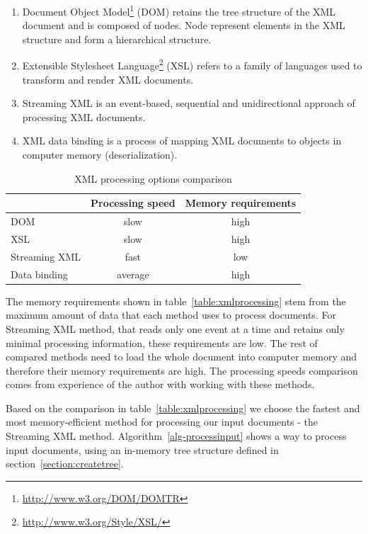 \documentclass[11pt,oneside,final]{fithesis2}
\begin{document}
\begin{enumerate}
\item Document Object Model\footnote{\url{http://www.w3.org/DOM/DOMTR}} (DOM) retains the tree structure of the XML document and is composed of nodes. Node represent elements in the XML structure and form a hierarchical structure.

\item Extensible Stylesheet Language\footnote{\url{http://www.w3.org/Style/XSL/}} (XSL) refers to a family of languages used to transform and render XML documents. 

\item Streaming XML is an event-based, sequential and unidirectional approach of processing XML documents.

\item XML data binding is a process of mapping XML documents to objects in computer memory (deserialization).
\end{enumerate}

\begin{table}[!ht]
\centering
\begin{tabular}{|l|c|c|}
\hline
& Processing speed & Memory requirements \\ \hline
\hline
DOM & slow & high  \\ \hline
XSL & slow & high  \\ \hline
Streaming XML & fast & low  \\ \hline
Data binding & average & high  \\ \hline
\end{tabular}
\caption{XML processing options comparison}
\label{table:xmlprocessing}
\end{table}

The memory requirements shown in table~\vref{table:xmlprocessing} stem from the maximum amount of data that each method uses to process documents. For Streaming XML method, that reads only one event at a time and retains only minimal processing information, these requirements are low. The rest of compared methods need to load the whole document into computer memory and therefore their memory requirements are high. The processing speeds comparison comes from experience of the author with working with these methods.

Based on the comparison in table~\vref{table:xmlprocessing} we choose the fastest and most memory-efficient method for processing our input documents - the Streaming XML method. Algorithm~\vref{alg-processinput} shows a way to process input documents, using an in-memory tree structure defined in section~\vref{section:createtree}.
\end{document}
